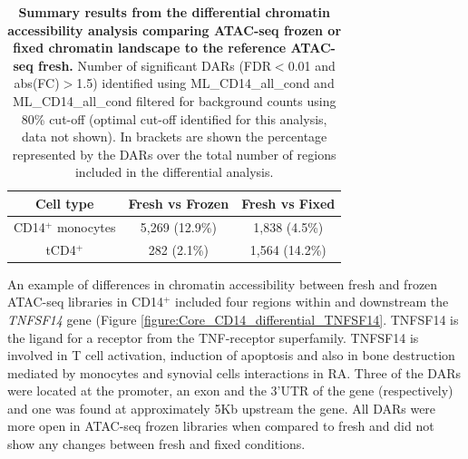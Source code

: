 	
\begin{table}[htbp]
\centering
\begin{tabular}{@{} c c c}
\toprule
\textbf{Cell type} & \textbf{Fresh vs Frozen} & \textbf{Fresh vs Fixed} \\
\midrule
\midrule
CD14$^+$ monocytes & 5,269 (12.9\%) & 1,838 (4.5\%) \\
tCD4$^+$           & 282  (2.1\%)   & 1,564 (14.2\%) \\
\bottomrule
\end{tabular}
\medskip %
\caption[Summary results from the differential chromatin accessibility analysis comparing ATAC-seq frozen or fixed chromatin landscape to the reference ATAC-seq fresh.]{\textbf{Summary results from the differential chromatin accessibility analysis comparing ATAC-seq frozen or fixed chromatin landscape to the reference ATAC-seq fresh.} Number of significant DARs (FDR$<$0.01 and abs(FC)$>$1.5) identified using ML\_CD14\_all\_cond and ML\_CD14\_all\_cond filtered for background counts using 80\% cut-off (optimal cut-off identified for this analysis, data not shown). In brackets are shown the percentage represented by the DARs over the total number of regions included in the differential analysis.}
\label{tab:Core_ATAC_all_conditions_DARs}
\end{table}
\bigskip %
	
An example of differences in chromatin accessibility between fresh and frozen ATAC-seq libraries in CD14$^+$ included four regions within and downstream the \textit{TNFSF14} gene (Figure \ref{figure:Core_CD14_differential_TNFSF14}. TNFSF14 is the ligand for a receptor from the TNF-receptor superfamily. TNFSF14 is involved in T cell activation, induction of apoptosis and  also in bone destruction mediated by monocytes and synovial cells interactions in RA. Three of the DARs were located at the promoter, an exon and the 3'UTR of the gene (respectively) and one was found at approximately 5Kb upstream the gene. All DARs were more open in ATAC-seq frozen libraries when compared to fresh and did not show any changes between fresh and fixed conditions.%

	
	
